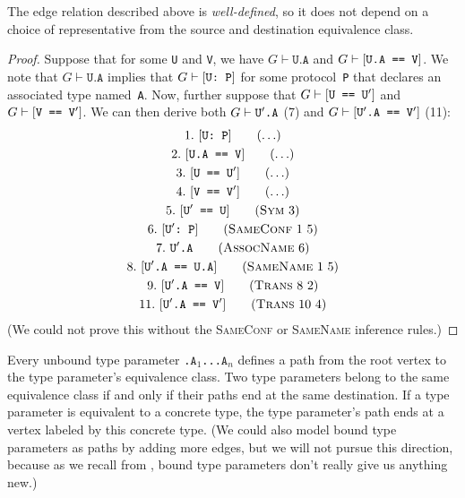 \documentclass[../generics]{subfiles}
\begin{document}
\begin{proposition}
The edge relation described above is \emph{well-defined}, so it does not depend on a choice of representative from the source and destination equivalence class.
\end{proposition}
\begin{proof}
Suppose that for some \texttt{U} and \texttt{V}, we have $G\vdash\texttt{U.A}$ and $G\vdash[\texttt{U.A == V}]$. We note that $G\vdash\texttt{U.A}$ implies that $G\vdash[\texttt{U:~P}]$ for some protocol~\texttt{P} that declares an associated type named~\texttt{A}.
Now, further suppose that $G\vdash[\texttt{U == $\texttt{U}^\prime$}]$ and $G\vdash[\texttt{V == $\texttt{V}^\prime$}]$. We can then derive both $G\vdash\texttt{U}^\prime\texttt{.A}$ (7) and $G\vdash[\texttt{$\texttt{U}^\prime$\texttt{.A} == $\texttt{V}^\prime$}]$ (11):
\begin{gather*}
\AnyStep{\ConfReq{U}{P}}{1}\\
\AnyStep{\SameReq{U.A}{V}}{2}\\
\AnyStep{\SameReq{U}{$\tUp$}}{3}\\
\AnyStep{\SameReq{V}{$\texttt{V}^\prime$}}{4}\\
\SymStep{3}{$\tUp$}{U}{5}\\
\SameConfStep{1}{5}{$\tUp$}{P}{6}\\
\AssocNameStep{6}{$\tUp$.A}{7}\\
\SameNameStep{1}{5}{$\tUp$.A}{U.A}{8}\\
\TransStep{8}{2}{$\tUp$.A}{V}{9}\\
\TransStep{10}{4}{$\tUp$.A}{$\texttt{V}^\prime$}{11}
\end{gather*}
(We could not prove this without the \textsc{SameConf} or \textsc{SameName} inference rules.)
\end{proof}

Every unbound type parameter \texttt{.$\texttt{A}_1$...$\texttt{A}_n$} defines a path from the root vertex to the type parameter's equivalence class. Two type parameters belong to the same equivalence class if and only if their paths end at the same destination. If a type parameter is equivalent to a concrete type, the type parameter's path ends at a vertex labeled by this concrete type. (We could also model bound type parameters as paths by adding more edges, but we will not pursue this direction, because as we recall from , bound type parameters don't really give us anything new.)
\end{document}

